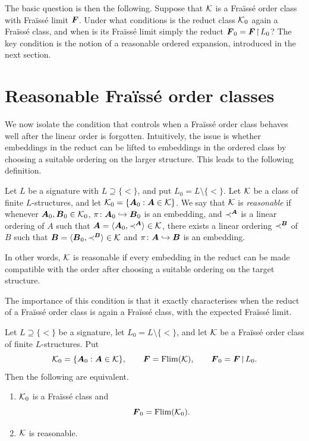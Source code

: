 The basic question is then the following. Suppose that \(\mathcal{K}\) is a Fraïssé order class with Fraïssé limit \(\boldsymbol{F}\). Under what conditions is the reduct class \(\mathcal{K}_0\) again a Fraïssé class, and when is its Fraïssé limit simply the reduct \(\boldsymbol{F}_0=\boldsymbol{F}\!\restriction\!L_0\)?
The key condition is the notion of a reasonable ordered expansion, introduced in the next section.

\section{Reasonable Fraïssé order classes}

We now isolate the condition that controls when a Fraïssé order class behaves well after the linear order is forgotten. Intuitively, the issue is whether embeddings in the reduct can be lifted to embeddings in the ordered class by choosing a suitable ordering on the larger structure. This leads to the following definition.

\begin{definition}
    \label{def:reasonable}
    Let \(L\) be a signature with \(L\supseteq\{<\}\), and put \(L_0=L\setminus\{<\}\). Let \(\mathcal{K}\) be a class of finite \(L\)-structures, and let \(\mathcal{K}_0=\{\boldsymbol{A}_0 : \boldsymbol{A}\in\mathcal{K}\}\). We say that \(\mathcal{K}\) is \emph{reasonable} if whenever \(\boldsymbol{A}_0,\boldsymbol{B}_0\in\mathcal{K}_0\), \(\pi\colon \boldsymbol{A}_0\hookrightarrow \boldsymbol{B}_0\) is an embedding, and \(\prec^{\boldsymbol{A}}\) is a linear ordering of \(A\) such that \(\boldsymbol{A}=\langle \boldsymbol{A}_0,\prec^{\boldsymbol{A}}\rangle\in\mathcal{K}\), there exists a linear ordering \(\prec^{\boldsymbol{B}}\) of \(B\) such that \(\boldsymbol{B}=\langle \boldsymbol{B}_0,\prec^{\boldsymbol{B}}\rangle\in\mathcal{K}\) and \(\pi\colon \boldsymbol{A}\hookrightarrow \boldsymbol{B}\) is an embedding.
\end{definition}

In other words, \(\mathcal{K}\) is reasonable if every embedding in the reduct can be made compatible with the order after choosing a suitable ordering on the target structure.

The importance of this condition is that it exactly characterises when the reduct of a Fraïssé order class is again a Fraïssé class, with the expected Fraïssé limit.

\begin{proposition}
    \label{prop:reasonable-characterization}
    Let \(L\supseteq\{<\}\) be a signature, let \(L_0=L\setminus\{<\}\), and let \(\mathcal{K}\) be a Fraïssé order class of finite \(L\)-structures. Put
    \[
        \mathcal{K}_0=\{\boldsymbol{A}_0 : \boldsymbol{A}\in\mathcal{K}\},
        \qquad
        \boldsymbol{F}=\operatorname{Flim}(\mathcal{K}),
        \qquad
        \boldsymbol{F}_0=\boldsymbol{F}\!\restriction\!L_0.
    \]
    Then the following are equivalent.
    \begin{enumerate}
        \item[(i)] \(\mathcal{K}_0\) is a Fraïssé class and
              \[
                  \boldsymbol{F}_0=\operatorname{Flim}(\mathcal{K}_0).
              \]
        \item[(ii)] \(\mathcal{K}\) is reasonable.
    \end{enumerate}
\end{proposition}


